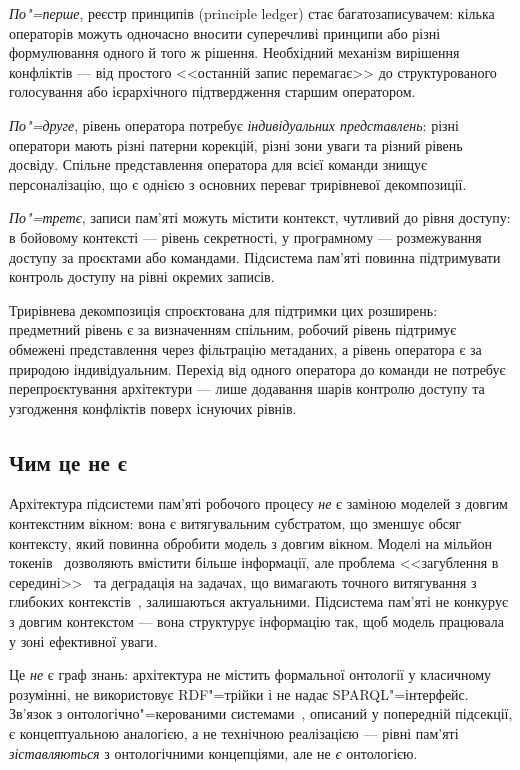 \emph{По"=перше}, реєстр принципів (principle ledger) стає багатозаписувачем: кілька операторів можуть одночасно вносити суперечливі принципи або різні формулювання одного й того ж рішення.
Необхідний механізм вирішення конфліктів --- від простого <<останній запис перемагає>> до структурованого голосування або ієрархічного підтвердження старшим оператором.

\emph{По"=друге}, рівень оператора потребує \emph{індивідуальних представлень}: різні оператори мають різні патерни корекцій, різні зони уваги та різний рівень досвіду.
Спільне представлення оператора для всієї команди знищує персоналізацію, що є однією з основних переваг трирівневої декомпозиції.

\emph{По"=третє}, записи пам'яті можуть містити контекст, чутливий до рівня доступу: в бойовому контексті --- рівень секретності, у програмному --- розмежування доступу за проєктами або командами.
Підсистема пам'яті повинна підтримувати контроль доступу на рівні окремих записів.

Трирівнева декомпозиція спроєктована для підтримки цих розширень: предметний рівень є за визначенням спільним, робочий рівень підтримує обмежені представлення через фільтрацію метаданих, а рівень оператора є за природою індивідуальним.
Перехід від одного оператора до команди не потребує перепроєктування архітектури --- лише додавання шарів контролю доступу та узгодження конфліктів поверх існуючих рівнів.


\subsection{Чим це не є}
\label{sec:disc-not}

Архітектура підсистеми пам'яті робочого процесу \emph{не} є заміною моделей з довгим контекстним вікном: вона є витягувальним субстратом, що зменшує обсяг контексту, який повинна обробити модель з довгим вікном.
Моделі на мільйон токенів~\citep{reid2024gemini} дозволяють вмістити більше інформації, але проблема <<загублення в середині>>~\citep{liu2023lost} та деградація на задачах, що вимагають точного витягування з глибоких контекстів~\citep{hsieh2024ruler}, залишаються актуальними.
Підсистема пам'яті не конкурує з довгим контекстом --- вона структурує інформацію так, щоб модель працювала у зоні ефективної уваги.

Це \emph{не} є граф знань: архітектура не містить формальної онтології у класичному розумінні, не використовує RDF"=трійки і не надає SPARQL"=інтерфейс.
Зв'язок з онтологічно"=керованими системами~\citep{palagin2006architecture}, описаний у попередній підсекції, є концептуальною аналогією, а не технічною реалізацією --- рівні пам'яті \emph{зіставляються} з онтологічними концепціями, але не \emph{є} онтологією.

